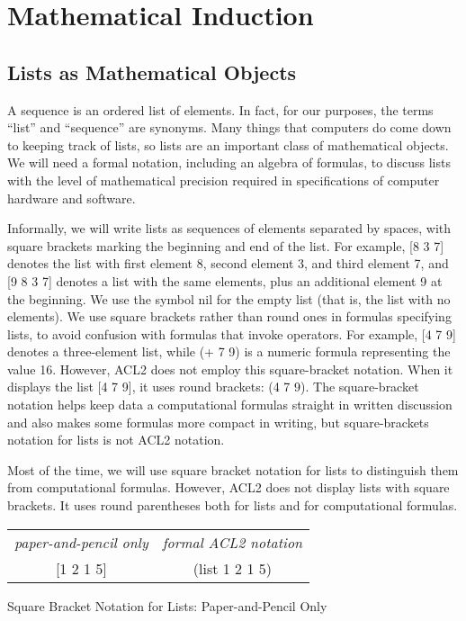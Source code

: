 \chapter{Mathematical Induction}
\label{ch:mathematical-induction}

\section{Lists as Mathematical Objects}
\label{sec:lists-as-obj}
A sequence
is an ordered list of elements.
In fact, for our purposes, the terms ``list'' and ``sequence'' are synonyms.
Many things that computers do come down to keeping track of lists,
so lists are an important class of mathematical objects.
We will need a formal notation, including an algebra of formulas,
to discuss lists with the level of mathematical precision
required in specifications of computer hardware and software.

Informally, we will write lists as sequences of elements separated by spaces,
with square brackets marking the beginning and end of the list.
For example, \textsf{[8 3 7]} denotes the list with first element 8,
second element 3, and third element 7, and
\textsf{[9 8 3 7]} denotes a list with the same elements,
plus an additional element 9 at the beginning.
\label{nil-def}
We use the symbol \textsf{nil} for the empty list
(that is, the list with no elements).
\label{square-brackets}We use
square brackets
rather than round ones in formulas
specifying lists, to avoid confusion with formulas that invoke operators.
For example, \textsf{[4 7 9]} denotes a three-element list,
while \textsf{(+ 7 9)} is a numeric formula representing the value 16.
However, ACL2 does not employ this square-bracket notation.
When it displays the list \textsf{[4 7 9]},
it uses round brackets: \textsf{(4 7 9)}.
The square-bracket notation helps keep data a computational formulas
straight in written discussion and also makes some
formulas more compact in writing, but square-brackets
notation for lists is not ACL2 notation.

\begin{aside}
Most of the time, we will use square bracket
notation for lists
to distinguish them from computational formulas.
However, ACL2 does not display lists with square brackets.
It uses round parentheses both for lists and for computational formulas.
\begin{center}
\vspace{1mm}
\begin{tabular}{cc}
 \emph{paper-and-pencil only} & \emph{formal ACL2 notation}\\
 \textsf{[1 2 1 5]}           & \textsf{(list 1 2 1 5)}\\
\end{tabular}
\end{center}
\caption{Square Bracket Notation for Lists: Paper-and-Pencil Only}
\label{square-bracket-notation}
\end{aside}

